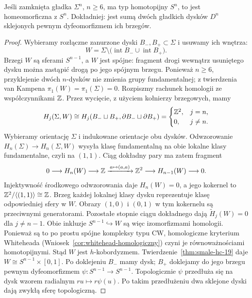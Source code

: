 \begin{wniosek}
\label{wn:homotopijna-sfera-19}
Jeśli zamknięta gładka
$\Sigma^n$, $n\geq6$,
ma typ homotopijny
$S^n$, to jest
homeomorficzna z $S^n$.
Dokładniej: jest sumą
dwóch gładkich dysków
$D^n$ sklejonych
pewnym dyfeomorfizmem
ich brzegów.
\end{wniosek}
\begin{proof}
Wybieramy rozłączne
zanurzone dyski
$B_-,B_+\subset\Sigma$
i usuwamy ich wnętrza:
\[
 W=\Sigma\setminus
   \bigl(\operatorname{int}B_-
          \cup\operatorname{int}B_+\bigr).
\]
Brzegi $W$ są sferami $S^{n-1}$, a $W$ jest spójne:
fragment drogi wewnątrz usuniętego dysku można zastąpić drogą
po jego spójnym brzegu.
Ponieważ $n\geq6$,
przyklejenie dwóch
$n$-dysków nie zmienia
grupy fundamentalnej;
z twierdzenia van Kampena
$\pi_1(W)=\pi_1(\Sigma)=0$.
Rozpiszmy rachunek homologii ze współczynnikami $\mathbb{Z}$.
Przez wycięcie, z użyciem kołnierzy brzegowych, mamy
\[
 H_j(\Sigma,W)\cong
 H_j(B_-\sqcup B_+,\partial B_-\sqcup\partial B_+)
 =\begin{cases}\mathbb{Z}^2,&j=n,\\0,&j\ne n.\end{cases}
\]
Wybieramy orientację $\Sigma$ i indukowane orientacje obu dysków.
Odwzorowanie $H_n(\Sigma)\to H_n(\Sigma,W)$ wysyła klasę
fundamentalną na obie lokalne klasy fundamentalne, czyli na $(1,1)$.
Ciąg dokładny pary ma zatem fragment
\[
 0\longrightarrow H_n(W)\longrightarrow\mathbb{Z}
 \xrightarrow{\,a\mapsto(a,a)\,}\mathbb{Z}^2
 \longrightarrow H_{n-1}(W)\longrightarrow0.
\]
Injektywność środkowego odwzorowania daje $H_n(W)=0$, a jego
kokernel to $\mathbb{Z}^2/\langle(1,1)\rangle\cong\mathbb{Z}$.
Brzeg każdej lokalnej klasy dysku reprezentuje klasę odpowiedniej
sfery w $W$. Obrazy $(1,0)$ i $(0,1)$ w tym kokernelu są
przeciwnymi generatorami. Pozostałe stopnie ciągu dokładnego
dają $\widetilde H_j(W)=0$ dla $j\ne n-1$.
Obie inkluzje
$S^{n-1}\hookrightarrow W$
są więc izomorfizmami
homologii. Ponieważ
są to po prostu spójne
kompleksy typu CW,
homologiczne kryterium Whiteheada
(Wniosek~\ref{cor:whitehead-homologiczny})
czyni je równoważnościami
homotopijnymi.
Stąd $W$ jest
$h$-kobordyzmem.
Twierdzenie~\ref{thm:smale-hc-19}
daje $W\cong S^{n-1}\times[0,1]$.
Po doklejeniu $B_-$ mamy
dysk; $B_+$ doklejamy
do jego brzegu pewnym
dyfeomorfizmem
$\psi:S^{n-1}\to S^{n-1}$.
Topologicznie $\psi$
przedłuża się na dysk
wzorem radialnym
$r u\mapsto r\psi(u)$.
Po takim przedłużeniu
dwa sklejone dyski
dają zwykłą sferę
topologiczną.
\end{proof}

